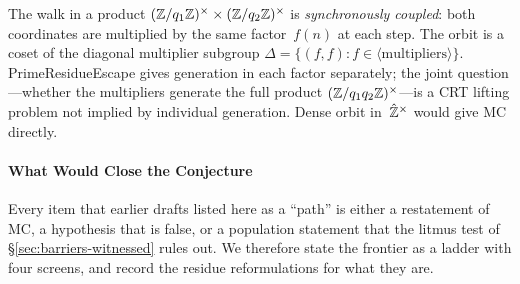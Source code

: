 The walk in a product
$(\mathbb{Z}/q_1\mathbb{Z})^\times \times (\mathbb{Z}/q_2\mathbb{Z})^\times$ is
\emph{synchronously coupled}: both coordinates are multiplied by the
same factor~$f(n)$ at each step.  The orbit is a coset of the diagonal
multiplier subgroup
$\Delta = \{(f,f) : f \in \langle\text{multipliers}\rangle\}$.
PrimeResidueEscape gives generation in each factor separately; the
joint question---whether the multipliers generate the full product
$(\mathbb{Z}/q_1 q_2\mathbb{Z})^\times$---is a CRT lifting problem not implied by
individual generation.  Dense orbit in~$\hat{\mathbb{Z}}^\times$ would give
MC directly.

\paragraph{What Would Close the Conjecture}

Every item that earlier drafts listed here as a ``path'' is either a
restatement of MC, a hypothesis that is false, or a population
statement that the litmus test of \S\ref{sec:barriers-witnessed}
rules out.  We therefore state the frontier as a ladder with four
screens, and record the residue reformulations for what they are.

